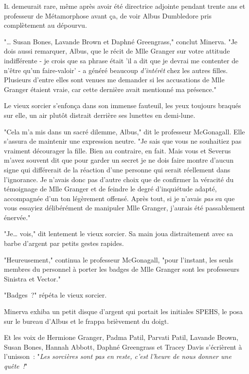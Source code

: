 
\lettrine{I}{l} demeurait rare, même après avoir été directrice adjointe pendant trente ans et professeur de Métamorphose avant ça, de voir Albus Dumbledore pris complètement au dépourvu.

"… Susan Bones, Lavande Brown et Daphné Greengrass," conclut Minerva. "Je dois aussi remarquer, Albus, que le récit de Mlle Granger sur votre attitude indifférente - je crois que sa phrase était 'il a dit que je devrai me contenter de n'être qu'un faire-valoir' - a généré beaucoup \emph{d'intérêt} chez les autres filles. Plusieurs d'entre elles sont venues me demander si les accusations de Mlle Granger étaient vraie, car cette dernière avait mentionné ma présence."

Le vieux sorcier s'enfonça dans son immense fauteuil, les yeux toujours braqués sur elle, un air plutôt distrait derrière ses lunettes en demi-lune.

"Cela m'a mis dans un sacré dilemme, Albus," dit le professeur McGonagall. Elle s'assura de maintenir une expression neutre. "Je sais que vous ne souhaitiez pas vraiment décourager la fille. Bien au contraire, en fait. Mais vous et Severus m'avez souvent dit que pour garder un secret je ne dois faire montre d'aucun signe qui différerait de la réaction d'une personne qui serait réellement dans l'ignorance. Je n'avais donc pas d'autre choix que de confirmer la véracité du témoignage de Mlle Granger et de feindre le degré d'inquiétude adapté, accompagnée d'un ton légèrement offensé. Après tout, si je n'avais \emph{pas} su que vous essayiez délibérément de manipuler Mlle Granger, j'aurais été passablement énervée."

"Je… vois," dit lentement le vieux sorcier. Sa main joua distraitement avec sa barbe d'argent par petits gestes rapides.

"Heureusement," continua le professeur McGonagall, "pour l'instant, les seuls membres du personnel à porter les badges de Mlle Granger sont les professeurs Sinistra et Vector."

"Badges~?" répéta le vieux sorcier.

Minerva exhiba un petit disque d'argent qui portait les initiales SPEHS, le posa sur le bureau d'Albus et le frappa brièvement du doigt.

Et les voix de Hermione Granger, Padma Patil, Parvati Patil, Lavande Brown, Susan Bones, Hannah Abbott, Daphné Greengrass et Tracey Davis s'écrièrent à l'unisson~: "\emph{Les sorcières sont pas en reste, c'est l'heure de nous donner une quête~!}"

